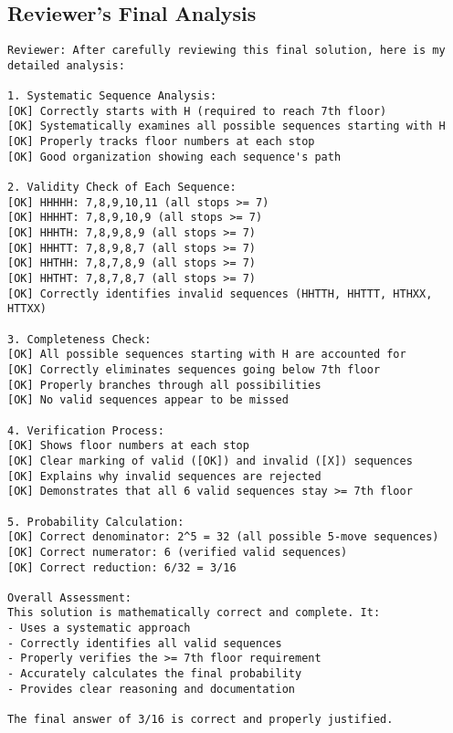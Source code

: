 \subsection{Reviewer's Final Analysis}
\vspace{-0.5em}
\begin{reviewerbox}
\begin{lstlisting}
Reviewer: After carefully reviewing this final solution, here is my detailed analysis:

1. Systematic Sequence Analysis:
[OK] Correctly starts with H (required to reach 7th floor)
[OK] Systematically examines all possible sequences starting with H
[OK] Properly tracks floor numbers at each stop
[OK] Good organization showing each sequence's path

2. Validity Check of Each Sequence:
[OK] HHHHH: 7,8,9,10,11 (all stops >= 7)
[OK] HHHHT: 7,8,9,10,9 (all stops >= 7)
[OK] HHHTH: 7,8,9,8,9 (all stops >= 7)
[OK] HHHTT: 7,8,9,8,7 (all stops >= 7)
[OK] HHTHH: 7,8,7,8,9 (all stops >= 7)
[OK] HHTHT: 7,8,7,8,7 (all stops >= 7)
[OK] Correctly identifies invalid sequences (HHTTH, HHTTT, HTHXX, HTTXX)

3. Completeness Check:
[OK] All possible sequences starting with H are accounted for
[OK] Correctly eliminates sequences going below 7th floor
[OK] Properly branches through all possibilities
[OK] No valid sequences appear to be missed

4. Verification Process:
[OK] Shows floor numbers at each stop
[OK] Clear marking of valid ([OK]) and invalid ([X]) sequences
[OK] Explains why invalid sequences are rejected
[OK] Demonstrates that all 6 valid sequences stay >= 7th floor

5. Probability Calculation:
[OK] Correct denominator: 2^5 = 32 (all possible 5-move sequences)
[OK] Correct numerator: 6 (verified valid sequences)
[OK] Correct reduction: 6/32 = 3/16

Overall Assessment:
This solution is mathematically correct and complete. It:
- Uses a systematic approach
- Correctly identifies all valid sequences
- Properly verifies the >= 7th floor requirement
- Accurately calculates the final probability
- Provides clear reasoning and documentation

The final answer of 3/16 is correct and properly justified.
\end{lstlisting}
\end{reviewerbox}

